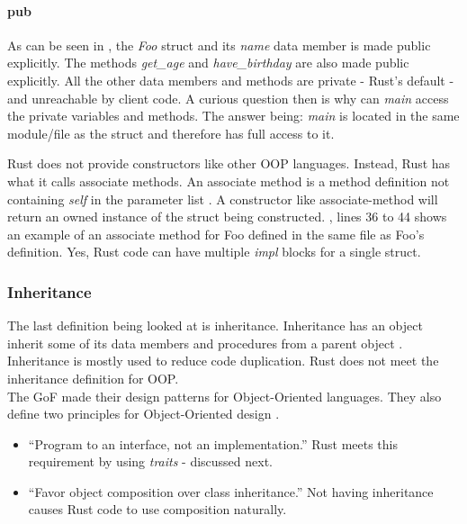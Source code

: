 \paragraph{pub}
As can be seen in , the \textit{Foo} struct and its \textit{name} data member is made public explicitly.
The methods \textit{get\_age} and \textit{have\_birthday} are also made public explicitly.
All the other data members and methods are private - Rust's default - and unreachable by client code.
A curious question then is why can \textit{main} access the private variables and methods.
The answer being: \textit{main} is located in the same module/file as the struct and therefore has full access to it.

\begin{notebox}
	Rust does not provide constructors like other OOP languages.
	Instead, Rust has what it calls associate methods.
	An associate method is a method definition not containing \textit{self} in the parameter list \cite{klabnik_2019_01}.
	A constructor like associate-method will return an owned instance of the struct being constructed.
	, lines 36 to 44 shows an example of an associate method for Foo defined in the same file as Foo's definition.
	Yes, Rust code can have multiple \textit{impl} blocks for a single struct.
\end{notebox}

\subsubsection{Inheritance}
The last definition being looked at is inheritance.
Inheritance has an object inherit some of its data members and procedures from a parent object \cite{meyer_97_01, stefik_85_01, gamma_94_01}.
Inheritance is mostly used to reduce code duplication.
Rust does not meet the inheritance definition for OOP.\\

The GoF made their design patterns for Object-Oriented languages.
They also define two principles for Object-Oriented design \cite{gamma_94_01}.
\begin{itemize}
	\item ``Program to an interface, not an implementation.''
	      Rust meets this requirement by using \textit{traits} - discussed next.
	\item ``Favor object composition over class inheritance.''
	      Not having inheritance causes Rust code to use composition naturally.
\end{itemize}

